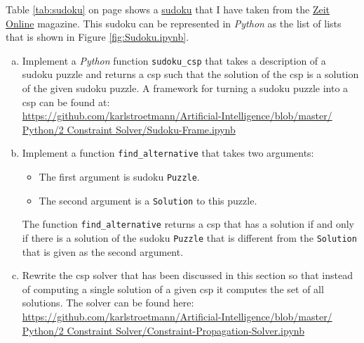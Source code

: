 \exercise
{}
Table \ref{tab:sudoku} on page \pageref{tab:sudoku} shows a \href{https://en.wikipedia.org/wiki/Sudoku}{sudoku}
that I have taken from the
\href{http://sudoku.zeit.de/cgi-bin/sudoku/sudoku_kd_app_2016.pl?action=level&kd_nr=24091123601092&year=2018&month=03&day=23&level=-c+5}{Zeit Online}
magazine.  This sudoku can be represented in \textsl{Python} as the list of lists that is shown in Figure
\ref{fig:Sudoku.ipynb}. 
\begin{enumerate}[(a)]
\item Implement a \textsl{Python} function \texttt{sudoku\_csp} that takes a description of a sudoku puzzle
      and returns a \ac{csp} such that the solution of the \ac{csp} is a solution of the given sudoku puzzle.
      A framework for turning a sudoku puzzle into a \ac{csp} can be found at:
      \\[0.2cm]
      \hspace*{1.3cm}
      \href{https://github.com/karlstroetmann/Artificial-Intelligence/blob/master/Python/2 Constraint
        Solver/Sudoku-Frame.ipynb}{https://github.com/karlstroetmann/Artificial-Intelligence/blob/master/\\
      \hspace*{2.6cm}  
          Python/2 Constraint Solver/Sudoku-Frame.ipynb}
\item Implement a function \texttt{find\_alternative} that takes two arguments:
  \begin{itemize}
  \item The first argument is sudoku \texttt{Puzzle}.
  \item The second argument is a \texttt{Solution} to this puzzle.
  \end{itemize}
  The function \texttt{find\_alternative} returns a \ac{csp} that has a solution if and only if there is a
  solution of the sudoku \texttt{Puzzle} that is different from the \texttt{Solution} that is given as the second argument.
\item Rewrite the \ac{csp} solver that has been discussed in this section so that instead of computing a single
      solution of a given \ac{csp} it computes the set of all solutions. 
      The solver can be found here:
      \\[0.2cm]
      \hspace*{1.3cm}
      \href{https://github.com/karlstroetmann/Artificial-Intelligence/blob/master/Python/2 Constraint Solver/Constraint-Propagation-Solver.ipynb}{https://github.com/karlstroetmann/Artificial-Intelligence/blob/master/\\
      \hspace*{2.6cm}  
        Python/2 Constraint Solver/Constraint-Propagation-Solver.ipynb}    
\end{enumerate}


